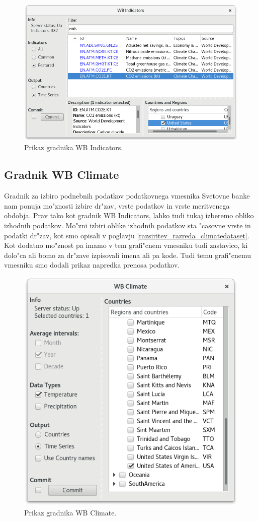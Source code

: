 \begin{figure}
\begin{center}
\includegraphics[width=12cm]{pic/co2_temp_indicator_selection.png}
\end{center}
\caption{Prikaz gradnika WB Indicators.}
\label{co2_temp_indicator}
\end{figure} 




\subsection{Gradnik WB Climate}

Gradnik za izbiro podnebnih podatkov podatkovnega vmesnika Svetovne banke nam
ponuja mo"znosti izbire dr"zav, vrste podatkov in vrste meritvenega obdobja.
Prav tako kot gradnik WB Indicators, lahko tudi tukaj izberemo obliko izhodnih
podatkov. Mo"zni izbiri oblike izhodnih podatkov sta "casovne vrste in podatki
dr"zav, kot smo opisali v poglavju \ref{razsiritev_razreda_climatedataset}. 
Kot dodatno mo"znost pa imamo v tem grafi"cnem vmesniku tudi zastavico, ki 
dolo"ca ali bomo za dr"zave izpisovali imena ali pa kode. Tudi temu grafi"cnemu
vmesniku smo dodali prikaz napredka prenosa podatkov.



\begin{figure}
\begin{center}
\includegraphics[width=12cm]{pic/co2_temp_climate_selection.png}
\end{center}
\caption{Prikaz gradnika WB Climate.}
\label{co2_temp_climate}
\end{figure} 
